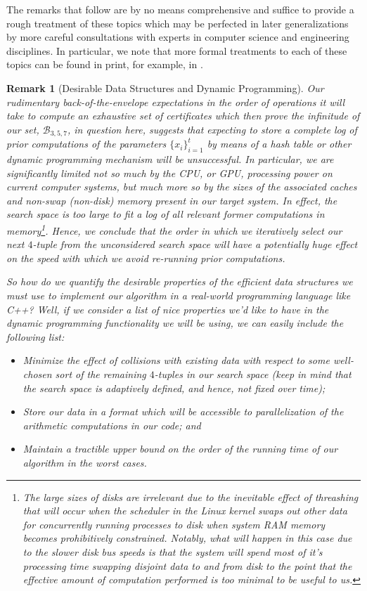\documentclass[12pt]{article}
\newtheorem{remark}[theorem]{Remark}
\begin{document}
The remarks that follow are by no means comprehensive and suffice to 
provide a rough treatment of these topics which may be perfected in later generalizations by 
more careful consultations with experts in computer science and engineering disciplines. 
In particular, we note that more formal treatments to each of these topics can be found in print, 
for example, in \cite{PARALLEL-COMPREF,TANENBAUM-OS}. 

\begin{remark}[Desirable Data Structures and Dynamic Programming] 
Our rudimentary back-of-the-envelope expectations in the order of operations it will take to compute an 
exhaustive set of certificates which then prove the infinitude of our set, $\mathcal{B}_{3,5,7}$, in question 
here, suggests that expecting to store a complete log of prior computations of the parameters 
$\{x_i\}_{i=1}^t$ by means of a hash table or other dynamic programming mechanism will be unsuccessful. 
In particular, we are significantly limited not so much by the CPU, or GPU, processing power on 
current computer systems, but much more so by the sizes of the associated caches and non-swap (non-disk) 
memory present in our target system. In effect, the search space is too large to fit a log of all 
relevant former computations in memory\footnote{ 
     The large sizes of disks are irrelevant due to the inevitable effect of 
     \emph{threashing} that will occur when the scheduler in the Linux kernel 
     swaps out other data for concurrently running processes to disk when system RAM memory becomes 
     prohibitively constrained. Notably, what will happen in this case due to the slower disk bus speeds 
     is that the system will spend most of it's processing time swapping disjoint data to and from disk 
     to the point that 
     the effective amount of computation performed is too minimal to be useful to us.
}. Hence, we conclude that the order in which we iteratively select our next $4$-tuple from the 
unconsidered search space will have a potentially huge effect on the speed with which we avoid re-running 
prior computations. 

\emph{So how do we quantify the desirable properties of the efficient data structures we must use to 
implement our algorithm in a real-world programming language like C++?} Well, if we consider a list of 
nice properties we'd like to have in the dynamic programming functionality we will be using, we can easily 
include the following list: 
\begin{itemize} 

\item[\textbf{1.}]
Minimize the effect of collisions with existing data with respect to some well-chosen 
sort of the remaining $4$-tuples in our search space (keep in mind that the search space is adaptively 
defined, and hence, not fixed over time); 
\item[\textbf{2.}]
Store our data in a format which will be accessible to parallelization of the arithmetic 
computations in our code; and 
\item[\textbf{3.}]
Maintain a tractible upper bound on the order of the running time of our algorithm in the worst cases. 
\end{itemize} 
\end{remark} 
\end{document}
